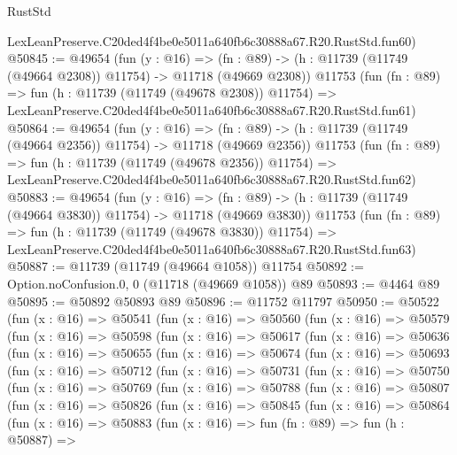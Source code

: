 \begin{lexlean}{RustStd}
\begin{coremodule}
    LexLeanPreserve.C20ded4f4be0e5011a640fb6c30888a67.R20.RustStd.fun60)
@50845 := @49654
    (fun (y : @16) =>
    (fn : @89) -> (h : @11739 (@11749 (@49664 @2308)) @11754) -> @11718 (@49669 @2308))
    @11753
    (fun (fn : @89) =>
    fun (h : @11739 (@11749 (@49678 @2308)) @11754) =>
    LexLeanPreserve.C20ded4f4be0e5011a640fb6c30888a67.R20.RustStd.fun61)
@50864 := @49654
    (fun (y : @16) =>
    (fn : @89) -> (h : @11739 (@11749 (@49664 @2356)) @11754) -> @11718 (@49669 @2356))
    @11753
    (fun (fn : @89) =>
    fun (h : @11739 (@11749 (@49678 @2356)) @11754) =>
    LexLeanPreserve.C20ded4f4be0e5011a640fb6c30888a67.R20.RustStd.fun62)
@50883 := @49654
    (fun (y : @16) =>
    (fn : @89) -> (h : @11739 (@11749 (@49664 @3830)) @11754) -> @11718 (@49669 @3830))
    @11753
    (fun (fn : @89) =>
    fun (h : @11739 (@11749 (@49678 @3830)) @11754) =>
    LexLeanPreserve.C20ded4f4be0e5011a640fb6c30888a67.R20.RustStd.fun63)
@50887 := @11739 (@11749 (@49664 @1058)) @11754
@50892 := Option.noConfusion.{0, 0} (@11718 (@49669 @1058)) @89
@50893 := @4464 @89
@50895 := @50892 @50893 @89
@50896 := @11752 @11797
@50950 := @50522
    (fun (x : @16) =>
    @50541
      (fun (x : @16) =>
      @50560
        (fun (x : @16) =>
        @50579
          (fun (x : @16) =>
          @50598
            (fun (x : @16) =>
            @50617
              (fun (x : @16) =>
              @50636
                (fun (x : @16) =>
                @50655
                  (fun (x : @16) =>
                  @50674
                    (fun (x : @16) =>
                    @50693
                      (fun (x : @16) =>
                      @50712
                        (fun (x : @16) =>
                        @50731
                          (fun (x : @16) =>
                          @50750
                            (fun (x : @16) =>
                            @50769
                              (fun (x : @16) =>
                              @50788
                                (fun (x : @16) =>
                                @50807
                                  (fun (x : @16) =>
                                  @50826
                                    (fun (x : @16) =>
                                    @50845
                                      (fun (x : @16) =>
                                      @50864
                                        (fun (x : @16) =>
                                        @50883
                                          (fun (x : @16) =>
                                          fun (fn : @89) =>
                                          fun (h : @50887) =>

\end{coremodule}
\end{lexlean}
